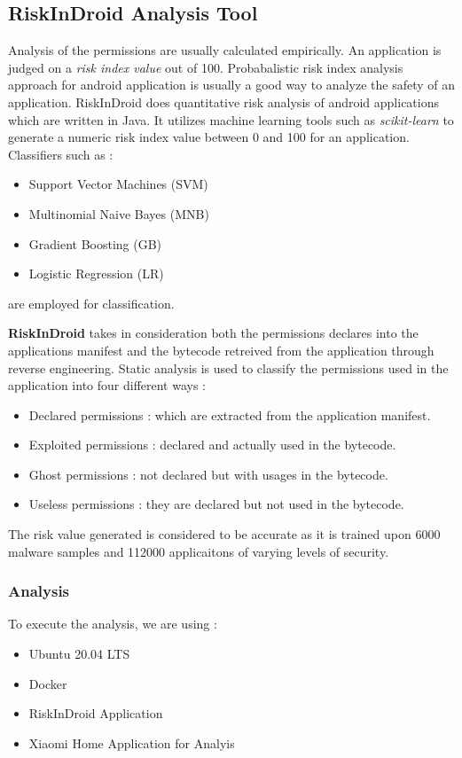 \documentclass[runningheads]{llncs}
\begin{document}
\subsection{RiskInDroid Analysis Tool}
Analysis of the permissions are usually calculated empirically. An application is judged on a \textit{risk index value} out of 100.
Probabalistic risk index analysis approach for android application is usually a good way to analyze the safety of an application.
RiskInDroid does quantitative risk analysis of android applications which are written in Java. It utilizes machine learning tools such as \textit{scikit-learn}
to generate a numeric risk index value between 0 and 100 for an application. Classifiers such as : \begin{itemize}
    \item Support Vector Machines (SVM)
    \item Multinomial Naive Bayes (MNB)
    \item Gradient Boosting (GB)
    \item Logistic Regression (LR)
\end{itemize}
are employed for classification. 

\textbf{RiskInDroid} takes in consideration both the permissions declares into the applications manifest and the bytecode retreived from the application through 
reverse engineering. Static analysis is used to classify the permissions used in the application into four different ways :
\begin{itemize}
    \item Declared permissions : which are extracted from the application manifest.
    \item Exploited permissions : declared and actually used in the bytecode.
    \item Ghost permissions : not declared but with usages in the bytecode.
    \item Useless permissions : they are declared but not used in the bytecode.
\end{itemize}

The risk value generated is considered to be accurate as it is trained upon 6000 malware samples and 112000 applicaitons of varying levels of security.

\subsubsection{Analysis}
To execute the analysis, we are using : 
\begin{itemize}
    \item Ubuntu 20.04 LTS
    \item Docker 
    \item RiskInDroid Application
    \item Xiaomi Home Application for Analyis
\end{itemize}
\end{document}
